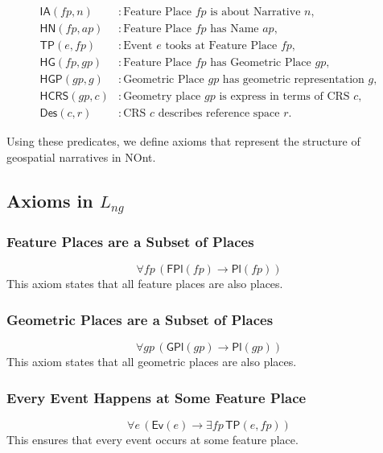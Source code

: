 \begin{align*}
    \textsf{IA}(fp, n) &: \text{Feature Place } fp \text{ is about Narrative } n, \\
    \textsf{HN}(fp, ap) &: \text{Feature Place } fp \text{ has Name } ap, \\
    \textsf{TP}(e, fp) &: \text{Event } e \text{ tooks at Feature Place } fp, \\
    \textsf{HG}(fp, gp) &: \text{Feature Place } fp \text{ has Geometric Place } gp, \\
    \textsf{HGP}(gp, g) &: \text{Geometric Place } gp \text{ has geometric representation } g, \\
    \textsf{HCRS}(gp, c) &: \text{Geometry place } gp \text{ is express in terms of CRS } c, \\
    \textsf{Des}(c, r) &: \text{CRS } c \text{ describes reference space } r.
\end{align*}

Using these predicates, we define axioms that represent the structure of geospatial narratives in NOnt.

\subsection{Axioms in \( L_{ng} \)}\label{V-subsec:axioms-lng}

\subsubsection{Feature Places are a Subset of Places}
\begin{equation}\label{eq:axiom1}
    \forall fp \, (\textsf{FPl}(fp) \rightarrow \textsf{Pl}(fp))
\end{equation}
This axiom states that all feature places are also places.

\subsubsection{Geometric Places are a Subset of Places}
\begin{equation}\label{eq:axiom2}
    \forall gp \, (\textsf{GPl}(gp) \rightarrow \textsf{Pl}(gp))
\end{equation}
This axiom states that all geometric places are also places.

\subsubsection{Every Event Happens at Some Feature Place}
\begin{equation}\label{eq:axiom3}
    \forall e \, (\textsf{Ev}(e) \rightarrow \exists fp \, \textsf{TP}(e, fp))
\end{equation}
This ensures that every event occurs at some feature place.

